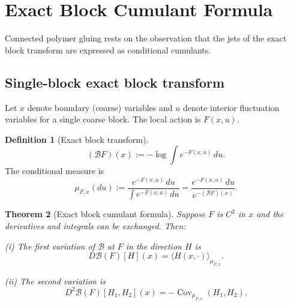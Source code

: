 \documentclass[12pt]{article}
\theoremstyle{plain}
\newtheorem{theorem}{Theorem}[section]
\theoremstyle{definition}
\newtheorem{definition}[theorem]{Definition}
\numberwithin{equation}{section}
\newcommand{\Cov}{\operatorname{Cov}}
\begin{document}
\section{Exact Block Cumulant Formula}\label{sec:cumulant}

Connected polymer gluing rests on the observation that the jets of the exact block transform are expressed as conditional cumulants.

\subsection{Single-block exact block transform}

Let $x$ denote boundary (coarse) variables and $u$ denote interior fluctuation variables for a single coarse block.  The local action is $F(x,u)$.

\begin{definition}[Exact block transform]
\begin{equation}
(\mathcal{B}F)(x) := -\log\int e^{-F(x,u)}\,du.
\end{equation}
The conditional measure is
\begin{equation}
\mu_{F,x}(du) := \frac{e^{-F(x,u)}\,du}{\int e^{-F(x,u)}\,du} = \frac{e^{-F(x,u)}\,du}{e^{-(\mathcal{B}F)(x)}}.
\end{equation}
\end{definition}

\begin{theorem}[Exact block cumulant formula]\label{thm:cumulantformula}
Suppose $F$ is $C^2$ in $x$ and the derivatives and integrals can be exchanged.  Then:

\emph{(i)} The first variation of $\mathcal{B}$ at $F$ in the direction $H$ is
\begin{equation}
D\mathcal{B}(F)[H](x) = \langle H(x,\cdot)\rangle_{\mu_{F,x}}.
\end{equation}

\emph{(ii)} The second variation is
\begin{equation}
D^2\mathcal{B}(F)[H_1,H_2](x) = -\Cov_{\mu_{F,x}}(H_1,H_2).
\end{equation}
\end{theorem}
\end{document}
